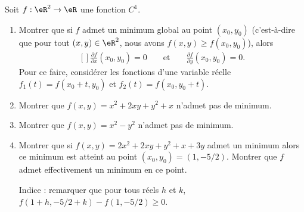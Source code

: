 \begin{exercice}\label{exoCalculDifferentiel0005}

Soit $f:\eR^2\to\eR$ une fonction $C^1$. 
\begin{enumerate}
	\item
Montrer que si $f$ admet un minimum global au point $(x_0,y_0)$ (c'est-à-dire que pour tout  $(x,y)\in\eR^2$, nous avons $f(x,y)\geq f(x_0,y_0)$), alors
\begin{equation}
	\begin{aligned}[]
		\frac{\partial f}{\partial x}(x_0,y_0) =0 &&\text{ et } &&  \frac{\partial f}{\partial y}(x_0,y_0) =0.
	\end{aligned}
\end{equation}
Pour ce faire, considérer les fonctions d'une variable réelle $f_1(t) = f(x_0+t,y_0)$ et $f_2(t)  =f(x_0,y_0+t)$.
\item
 Montrer que $f(x,y) = x^2 + 2xy + y^2 +x$ n'admet pas de minimum.
\item
 Montrer que $f(x,y) = x^2 - y^2$ n'admet pas de minimum.
\item
 Montrer que si $f(x,y) = 2x^2 + 2xy + y^2 +x + 3y$ admet un minimum alors ce minimum est atteint au point $(x_0,y_0) = (1, -5/2)$. Montrer que $f$ admet effectivement un minimum en ce point. 

 Indice : remarquer que pour tous réels $h$ et $k$, $f(1+h,-5/2+k) -  f(1,-5/2) \geq 0$.
\end{enumerate}


\end{exercice}
